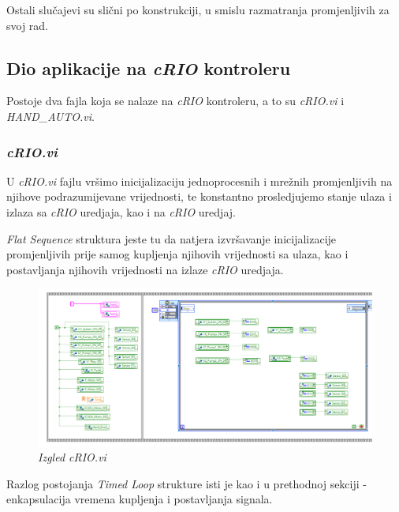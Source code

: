 \documentclass[12pt, titlepage]{article}
\begin{document}
            Ostali slučajevi su slični po konstrukciji, u smislu razmatranja promjenljivih za svoj rad.
        
        \subsection{\textbf{Dio aplikacije na \textit{cRIO} kontroleru}}
        
            Postoje dva fajla koja se nalaze na \textit{cRIO} kontroleru, a to su 
            \textit{cRIO.vi} i \textit{HAND\_AUTO.vi}.

            \subsubsection{\textit{cRIO.vi}}

                U \textit{cRIO.vi} fajlu vršimo inicijalizaciju jednoprocesnih i mrežnih promjenljivih
                na njihove podrazumijevane vrijednosti, te konstantno prosledjujemo stanje ulaza i izlaza
                sa \textit{cRIO} uredjaja, kao i na \textit{cRIO} uredjaj.

                \textit{Flat Sequence} struktura jeste tu da natjera izvršavanje inicijalizacije promjenljivih 
                prije samog kupljenja njihovih vrijednosti sa ulaza, kao i postavljanja njihovih vrijednosti na 
                izlaze \textit{cRIO} uredjaja.

                \begin{figure}[ht]
                    \centering
                    \includegraphics[width=\textwidth]{Slike/cRIO.vi CODE.png}
                    \caption{\textit{Izgled cRIO.vi}}
                \end{figure}

                Razlog postojanja \textit{Timed Loop} strukture isti je kao i u prethodnoj sekciji - enkapsulacija vremena
                kupljenja i postavljanja signala.
\end{document}
